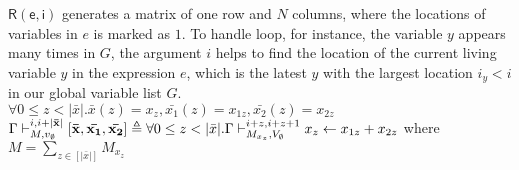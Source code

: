 \documentclass[a4paper,11pt]{article}
\begin{document}
$\mathsf{R(e, i)}$ generates a matrix of one row and $N$ columns, where the locations of variables in $e$ is marked as $1$. To handle loop, for instance, the variable $y$ appears many times in $G$, the argument $i$ helps to find the location of the current living variable $y$ in the expression $e$, which is the latest $y$ with the largest location $i_y< i$ in our global variable list $G$.\\ 


{$ \forall 0 \leq z < |\bar{x}|. \bar{x}(z) = x_z, \bar{x_1}(z) = x_{1z}, \bar{x_2}(z) = x_{2z} $ } \\

$ \Gamma \vdash_{M,v_{\emptyset}}^{i, i+ |\mathbf{{\bar{x}}}|} \mathbf{{[ \bar{x},\bar{x_1},\bar{x_2}   ]}} \triangleq { \forall 0 \leq z < |\bar{x}|.  \Gamma \vdash_{M_{x_z}, V_{\emptyset}}^{i+z, i+z+1 } x_z \leftarrow x_{1z} + x_{2z} }$ where $M = \sum_{z\in [|\bar{x}|] }M_{x_z} $\\
\end{document}
